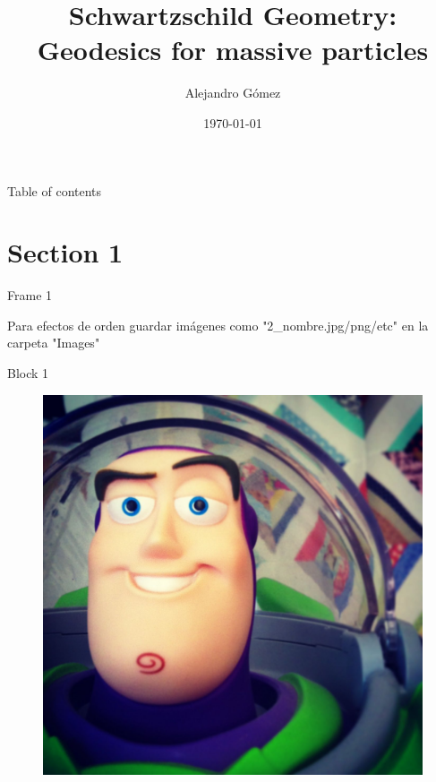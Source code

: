 \documentclass[xcolor=dvipsnames]{beamer}
\title[Schwartzschild geometry]{Schwartzschild Geometry: Geodesics for massive particles}
\date{\today}
\author[Universidad del Valle]{Alejandro Gómez }
\institute[]{Universidad del Valle \\ Departamento de física}
\begin{document}
	
	\begin{frame}
		\titlepage
	\end{frame}
	
	\begin{frame}{Table of contents}
    \tableofcontents
	\end{frame}
	
	
\section{Section 1}

\begin{frame}{Frame 1}

Para efectos de orden guardar imágenes como "2\_nombre.jpg/png/etc" en la carpeta "Images"

\begin{block}{Block 1}
\cite{hobson_efstathiou_lasenby_2006}    
\end{block}

\begin{figure}
    \centering
    \includegraphics[width=0.25 \textwidth]{Presentations/Images/sample.jpg}
\end{figure}
    
\end{frame}
\end{document}
